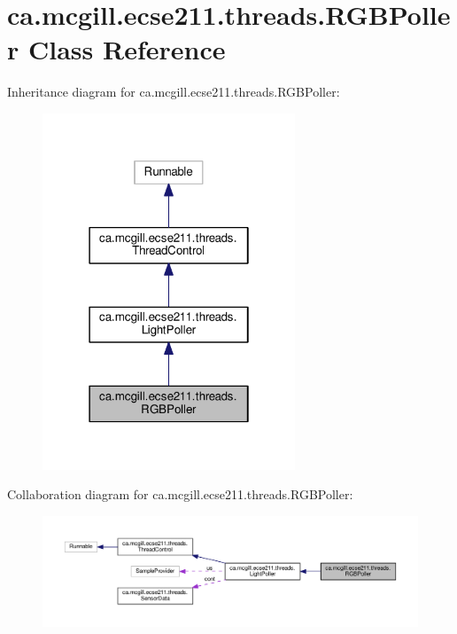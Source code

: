 \hypertarget{classca_1_1mcgill_1_1ecse211_1_1threads_1_1_r_g_b_poller}{}\section{ca.\+mcgill.\+ecse211.\+threads.\+R\+G\+B\+Poller Class Reference}
\label{classca_1_1mcgill_1_1ecse211_1_1threads_1_1_r_g_b_poller}


Inheritance diagram for ca.\+mcgill.\+ecse211.\+threads.\+R\+G\+B\+Poller\+:
\nopagebreak
\begin{figure}[H]
\begin{center}
\leavevmode
\includegraphics[width=214pt]{classca_1_1mcgill_1_1ecse211_1_1threads_1_1_r_g_b_poller__inherit__graph}
\end{center}
\end{figure}


Collaboration diagram for ca.\+mcgill.\+ecse211.\+threads.\+R\+G\+B\+Poller\+:
\nopagebreak
\begin{figure}[H]
\begin{center}
\leavevmode
\includegraphics[width=350pt]{classca_1_1mcgill_1_1ecse211_1_1threads_1_1_r_g_b_poller__coll__graph}
\end{center}
\end{figure}
